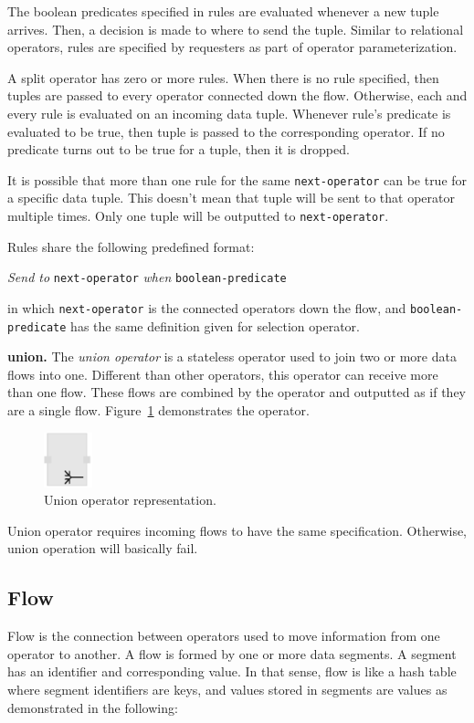 The boolean predicates specified in rules are evaluated whenever a new tuple 
arrives. Then, a decision is made to where to send the tuple. Similar to relational 
operators, rules are specified by requesters as part of operator 
parameterization.

A split operator has zero or more rules. When there is no rule specified, then 
tuples are passed to every operator connected down the flow. Otherwise, each 
and every rule is evaluated on an incoming data tuple. Whenever rule's predicate 
is evaluated to be true, then tuple is passed to the corresponding operator. If no 
predicate turns out to be true for a tuple, then it is dropped.

It is possible that more than one rule for the same \texttt{next-operator} can be true 
for a specific data tuple. This doesn't mean that tuple will be sent to that operator 
multiple times. Only one tuple will be outputted to \texttt{next-operator}.

Rules share the following predefined format:

\textit{Send to} \texttt{next-operator} \textit{when} \texttt{boolean-predicate}

in which \texttt{next-operator} is the connected operators down the flow, and 
\texttt{boolean-predicate} has the same definition given for selection operator.

\textbf{union.}
The \textit{union operator} is a stateless operator used to join two or more data flows 
into one. Different than other operators, this operator can receive more than one flow. 
These flows are combined by the operator and outputted as if they are a single flow. 
Figure~\ref{fig:union operator} demonstrates the operator.

\begin{figure}[ht]
	\centering
	\includegraphics[height=60px]{figures/UnionOperator.pdf}
	\caption{Union operator representation.}
	\label{fig:union operator}
\end{figure}

Union operator requires incoming flows to have the same specification. Otherwise, 
union operation will basically fail.

\subsection{Flow}
Flow is the connection between operators used to move information from one operator 
to another. A flow is formed by one or more data segments. A segment has an identifier 
and corresponding value. In that sense, flow is like a hash table where segment identifiers 
are keys, and values stored in segments are values as demonstrated in the following:

